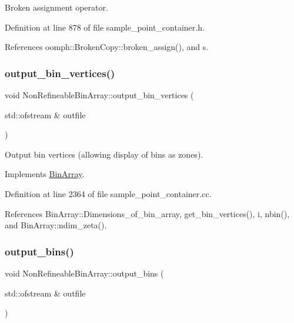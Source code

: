 Broken assignment operator. 



Definition at line 878 of file sample\+\_\+point\+\_\+container.\+h.



References oomph\+::\+Broken\+Copy\+::broken\+\_\+assign(), and s.

\mbox{\label{classNonRefineableBinArray_a9db5392fc81650a23251f1f5de52f0af}} 
\subsubsection{\texorpdfstring{output\+\_\+bin\+\_\+vertices()}{output\_bin\_vertices()}}
{\footnotesize\ttfamily void Non\+Refineable\+Bin\+Array\+::output\+\_\+bin\+\_\+vertices (\begin{DoxyParamCaption}\item[{std\+::ofstream \&}]{outfile }\end{DoxyParamCaption})\hspace{0.3cm}{\ttfamily [virtual]}}



Output bin vertices (allowing display of bins as zones). 



Implements \hyperlink{classBinArray_afc595a05f2ab19e1bb973c5a076b1432}{Bin\+Array}.



Definition at line 2364 of file sample\+\_\+point\+\_\+container.\+cc.



References Bin\+Array\+::\+Dimensions\+\_\+of\+\_\+bin\+\_\+array, get\+\_\+bin\+\_\+vertices(), i, nbin(), and Bin\+Array\+::ndim\+\_\+zeta().

\mbox{\label{classNonRefineableBinArray_aace5835e23625cc491a2fe084823ac3a}} 
\subsubsection{\texorpdfstring{output\+\_\+bins()}{output\_bins()}\hspace{0.1cm}{\footnotesize\ttfamily [1/2]}}
{\footnotesize\ttfamily void Non\+Refineable\+Bin\+Array\+::output\+\_\+bins (\begin{DoxyParamCaption}\item[{std\+::ofstream \&}]{outfile }\end{DoxyParamCaption})\hspace{0.3cm}{\ttfamily [virtual]}}



